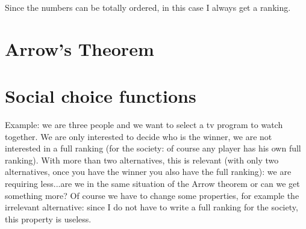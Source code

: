 \noindent Since the numbers can be totally ordered, in this case I always get 
a ranking.

\section{Arrow's Theorem}



\section{Social choice functions}

\noindent Example: we are three people and we want to select a tv program to 
watch together. We are only interested to decide who is the winner, we are not 
interested in a full ranking (for the society: of course any player has his 
own full ranking). With more than two alternatives, this is relevant (with only 
two alternatives, once you have the winner you also have the full ranking): we 
are requiring less...are we in the same situation of the Arrow theorem or can 
we get something more? Of course we have to change some properties, for example 
the irrelevant alternative: since I do not have to write a full ranking for the 
society, this property is useless.

